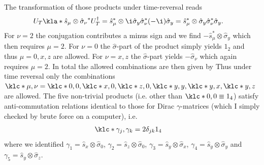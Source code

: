 \documentclass[english, parskip=full]{scrartcl}
\begin{document}
The transformation of those products under time-reversal reads
\begin{align}
U_T\kla*{\hat{s}_\mu \otimes \hat{\sigma}_\nu}^\ast U_T^\dagger &= \hat{s}_\mu^\ast \otimes \i\hat{\sigma}_y\hat{\sigma}_\nu^\ast (-\i)\hat{\sigma}_y = \hat{s}_\mu^\ast \otimes \hat{\sigma}_y\hat{\sigma}_\nu^\ast \hat{\sigma}_y. %
\end{align}
For $\nu=2$ the conjugation contributes a minus sign and we find $-\hat{s}_\mu^\ast \otimes \hat{\sigma}_y$ which then requires $\mu=2$.
For $\nu=0$ the $\hat{\sigma}$-part of the product simply yields $1_2$ and thus $\mu=0,x,z$ are allowed.
For $\nu=x,z$ the $\hat{\sigma}$-part yields $-\hat{\sigma}_\nu$ which again requires $\mu=2$.
In total the allowed combinations are then given by 
Thus under time reversal only the combinations $\klc*{\mu,\nu} = \klc*{0,0}, \klc*{x,0}, \klc*{z,0}, \klc*{y,y}, \klc*{y,x}, \klc*{y,z}$ are allowed.
The five non-trivial products (i.e. other than $\klc*{0,0} \equiv 1_4$) satisfy anti-commutation relations identical to those for Dirac $\gamma$-matrices (which I simply checked by brute force on a computer), i.e. 
\begin{align}
\klc*{\gamma_j, \gamma_k} &= 2\delta_{jk} 1_4
\end{align}
where we identified $\gamma_1 = \hat{s}_x \otimes \hat{\sigma}_0$, $\gamma_2 = \hat{s}_z \otimes \hat{\sigma}_0$, $\gamma_3 = \hat{s}_y \otimes \hat{\sigma}_x$, $\gamma_4 = \hat{s}_y \otimes \hat{\sigma}_y$ and $\gamma_5 = \hat{s}_y \otimes \hat{\sigma}_z$.
\end{document}
